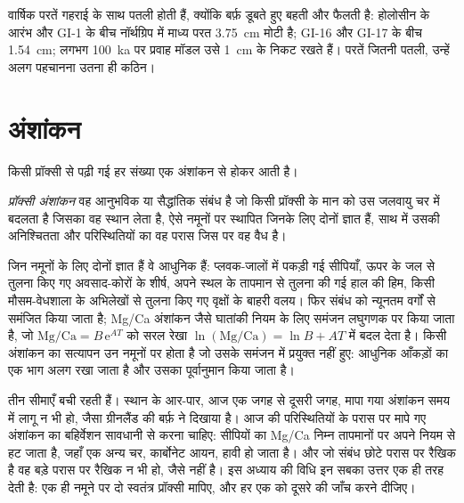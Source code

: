 वार्षिक परतें गहराई के साथ पतली होती हैं, क्योंकि बर्फ़ डूबते हुए बहती और फैलती है: होलोसीन के आरंभ
और GI-1 के बीच नॉर्थग्रिप में माध्य परत \qty{3.75}{cm} मोटी है; GI-16 और
GI-17 के बीच \qty{1.54}{cm}; लगभग \qty{100}{ka} पर प्रवाह मॉडल उसे \qty{1}{cm} के निकट रखते हैं। परतें जितनी पतली, उन्हें
अलग पहचानना उतना ही कठिन।

\section{अंशांकन}\label{sec:b2:climate-proxies:calibration}

किसी प्रॉक्सी से पढ़ी गई हर संख्या एक अंशांकन से होकर आती है।

\begin{definition}[प्रॉक्सी अंशांकन]\label{def:b2:climate-proxies:calibration}
\emph{प्रॉक्सी अंशांकन} वह आनुभविक या सैद्धांतिक संबंध है जो
किसी प्रॉक्सी के मान को उस जलवायु चर में बदलता है जिसका वह स्थान लेता है, ऐसे नमूनों पर स्थापित जिनके
लिए दोनों ज्ञात हैं, साथ में उसकी अनिश्चितता और परिस्थितियों का वह परास जिस पर वह
वैध है।
\end{definition}

जिन नमूनों के लिए दोनों ज्ञात हैं वे आधुनिक हैं: प्लवक-जालों में पकड़ी गई सीपियाँ, ऊपर के जल से तुलना किए गए अवसाद-कोरों के शीर्ष, अपने स्थल के तापमान से तुलना की गई
हाल की हिम, किसी मौसम-वेधशाला के अभिलेखों से तुलना किए गए वृक्षों के बाहरी वलय।
फिर संबंध को न्यूनतम वर्गों से समंजित किया जाता है; Mg/Ca अंशांकन जैसे घातांकी नियम के लिए
समंजन लघुगणक पर किया जाता है, जो $\text{Mg/Ca} = B\,\mathrm{e}^{AT}$ को
सरल रेखा $\ln(\text{Mg/Ca}) = \ln B + AT$ में बदल देता है। किसी अंशांकन का सत्यापन उन नमूनों पर होता है जो
उसके समंजन में प्रयुक्त नहीं हुए: आधुनिक आँकड़ों का एक भाग अलग रखा जाता है और उसका पूर्वानुमान किया जाता है।

तीन सीमाएँ बची रहती हैं। स्थान के आर-पार, आज एक जगह से दूसरी जगह, मापा गया अंशांकन समय में
लागू न भी हो, जैसा ग्रीनलैंड की बर्फ़ ने दिखाया है। आज की परिस्थितियों के परास पर मापे गए अंशांकन का
बहिर्वेशन सावधानी से करना चाहिए: सीपियों का Mg/Ca निम्न तापमानों पर अपने नियम से हट जाता है, जहाँ
एक अन्य चर, कार्बोनेट आयन, हावी हो जाता है। और जो संबंध छोटे परास पर रैखिक है वह
बड़े परास पर रैखिक न भी हो, जैसे  नहीं है। इस अध्याय की विधि
इन सबका उत्तर एक ही तरह देती है: एक ही नमूने पर दो स्वतंत्र प्रॉक्सी मापिए, और हर एक को
दूसरे की जाँच करने दीजिए।

